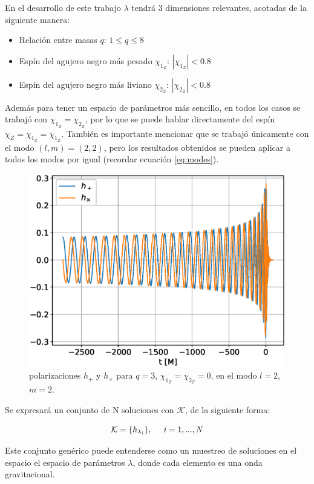 En el desarrollo de este trabajo \(\lambda\) tendrá 3 dimensiones relevantes, acotadas de la siguiente manera:

\begin{itemize}
\item Relación entre masas $q$: $1 \le q \le 8$
\item Espín del agujero negro más pesado $\chi_{1_Z}$: $|\chi_{1_Z}| < 0.8$
\item Espín del agujero negro más liviano $\chi_{2_Z}$: $|\chi_{2_Z}| < 0.8$
\end{itemize}

Además para tener un espacio de parámetros más sencillo, en todos los casos se trabajó con $\chi_{1_Z} = \chi_{2_Z}$, por lo que se puede hablar directamente del espín $\chi_{Z}=\chi_{1_Z} = \chi_{1_Z}$. También es importante mencionar que se trabajó únicamente con el modo $(l, m) =(2, 2)$, pero los resultados obtenidos se pueden aplicar a todos los modos por igual (recordar ecuación \eqref{eq:modes}).

\begin{figure}[h]
\centering
\includegraphics[width=.9\columnwidth]{figs/h_l2m2_q3.eps}
\caption{polarizaciones \(h_+\) y \(h_{\times}\) para $q = 3$, $\chi_{1_Z} = \chi_{2_Z} = 0$, en el modo $l=2$, $m=2$.}
\label{fig:h_q3}
\end{figure}


Se expresará un conjunto de N soluciones con \( \mathcal{K} \), de la siguiente forma:

\[ \mathcal{K}  = \{h_{\lambda_i}\}, \hspace{5mm} i = 1, ..., N\]

Este conjunto genérico puede entenderse como un muestreo de soluciones en el espacio el espacio de parámetros $\lambda$, donde cada elemento es una onda gravitacional.

